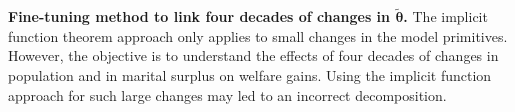 

\vspace{5mm}
\noindent \textbf{Fine-tuning method to link four decades of changes in $\tilde{\boldsymbol{\theta}}$.} The implicit function theorem approach  only applies to small changes in the model primitives. However, the objective is to understand the effects of four decades of changes in population and in marital surplus on welfare gains. Using the implicit function approach for such large changes may led to an incorrect decomposition. 

